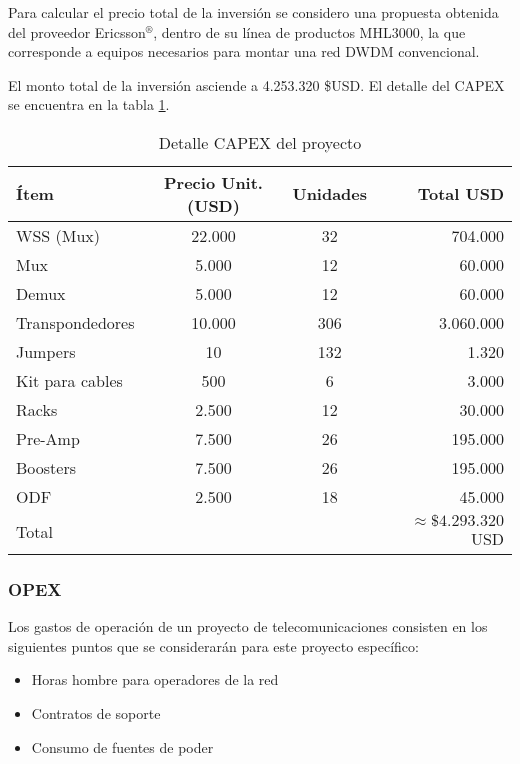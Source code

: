 Para calcular el precio total de la inversión se considero una propuesta obtenida del proveedor \newline Ericsson$^\circledR$, dentro de su línea de productos MHL3000, la que corresponde a equipos necesarios para montar una red DWDM convencional.

El monto total de la inversión asciende a 4.253.320 \$USD. El detalle del CAPEX se encuentra en la tabla \ref{tab:capex}.

\begin{table}[H]
  \centering
  \begin{tabular}{| l | c | c | r |}
    \hline
    \textbf{Ítem} & \textbf{Precio Unit. (USD)} & \textbf{Unidades} & \textbf{Total USD} \\
    \hline
    WSS (Mux) & 22.000 & 32 & 704.000\\
    \hline
    Mux  & 5.000 & 12 & 60.000 \\
    \hline
    Demux & 5.000 & 12 & 60.000 \\
    \hline
    Transpondedores  & 10.000 & 306 & 3.060.000 \\
    \hline
    Jumpers  & 10 & 132 & 1.320 \\
    \hline
    Kit para cables & 500 & 6 & 3.000 \\
    \hline
    Racks  & 2.500 & 12 & 30.000 \\
    \hline
    Pre-Amp & 7.500 & 26 & 195.000\\
    \hline
    Boosters & 7.500 & 26 & 195.000\\
    \hline
    ODF & 2.500 & 18 & 45.000\\
    \hline    
    Total & & & $\approx \$4.293.320$ USD \\
    \hline
  \end{tabular}
  \caption{Detalle CAPEX del proyecto}
  \label{tab:capex}
\end{table}

\subsubsection{OPEX}
\label{sec:opex}

Los gastos de operación de un proyecto de telecomunicaciones consisten en los siguientes puntos que se considerarán para este proyecto específico:
\begin{itemize}
\item Horas hombre para operadores de la red
\item Contratos de soporte
\item Consumo de fuentes de poder
\end{itemize}

